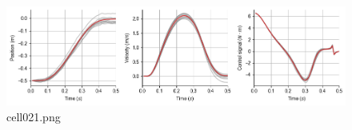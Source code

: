 \begin{figure}[ht]
	\centering
	\includegraphics[scale=0.8, max width=\linewidth]{./fig/motor-learning/optimal-feedback-control/cell021.png}
	\caption{cell021.png}
	\label{cell021.png}
\end{figure}